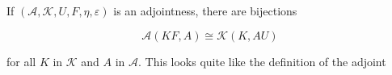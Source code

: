 If $(\mathcal{A}, \mathcal{K}, U, F, \eta, \varepsilon)$ is an adjointness, there are bijections

$$\mathcal{A}(KF, A) \cong \mathcal{K}(K, AU)$$

for all $K$ in $\mathcal{K}$ and $A$ in $\mathcal{A}$. This looks quite like the definition of the adjoint